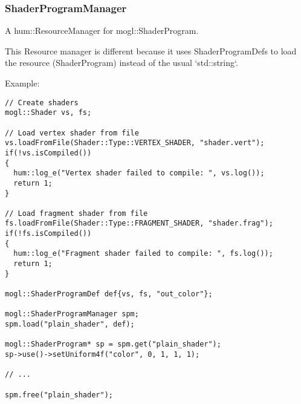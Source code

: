 \subsubsection{ShaderProgramManager}
A hum::ResourceManager for mogl::ShaderProgram.

This Resource manager is different because it uses ShaderProgramDefs to load
the resource (ShaderProgram) instead of the usual `std::string`.

Example:
\begin{lstlisting}[caption=ShaderProgramManager example]
// Create shaders
mogl::Shader vs, fs;

// Load vertex shader from file
vs.loadFromFile(Shader::Type::VERTEX_SHADER, "shader.vert");
if(!vs.isCompiled())
{
  hum::log_e("Vertex shader failed to compile: ", vs.log());
  return 1;
}

// Load fragment shader from file
fs.loadFromFile(Shader::Type::FRAGMENT_SHADER, "shader.frag");
if(!fs.isCompiled())
{
  hum::log_e("Fragment shader failed to compile: ", fs.log());
  return 1;
}

mogl::ShaderProgramDef def{vs, fs, "out_color"};

mogl::ShaderProgramManager spm;
spm.load("plain_shader", def);

mogl::ShaderProgram* sp = spm.get("plain_shader");
sp->use()->setUniform4f("color", 0, 1, 1, 1);

// ...

spm.free("plain_shader");
\end{lstlisting}
